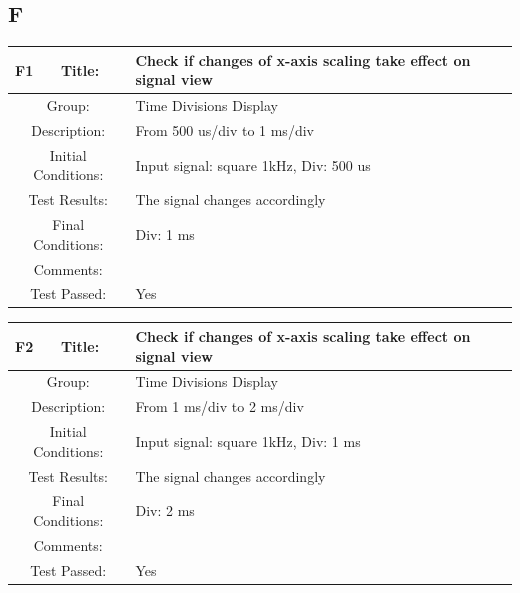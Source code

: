 \documentclass[12pt]{article}
\begin{document}
\subsection{F}
		\begin{table}[H]
	\begin{center}
		\begin{tabular}{| m{2cm}|m{2cm}|m{12cm}|}
			\hline 
			\bf F1&\bf Title:&\bf Check if changes of x-axis scaling take effect on signal view\\ 
			\hline 
			\multicolumn{2}{|c|}{Group:}&Time Divisions Display\\ 
			\hline 
			\multicolumn{2}{|c|}{Description:}&From 500 us/div to 1 ms/div\\ 
			\hline 
			\multicolumn{2}{|c|}{Initial Conditions:}&Input signal: square 1kHz, Div: 500 us\\ 
			\hline 
			\multicolumn{2}{|c|}{Test Results:}&The signal changes accordingly\\ 
			\hline 
			\multicolumn{2}{|c|}{Final Conditions:}&Div: 1 ms\\ 
			\hline 
			\multicolumn{2}{|c|}{Comments:}&\\ 
			\hline 
			\multicolumn{2}{|c|}{Test Passed:}&Yes \\ 
			\hline 
		\end{tabular} 
	\end{center}
\end{table}	
		\begin{table}[H]
	\begin{center}
		\begin{tabular}{| m{2cm}|m{2cm}|m{12cm}|}
			\hline 
			\bf F2&\bf Title:&\bf Check if changes of x-axis scaling take effect on signal view\\ 
			\hline 
			\multicolumn{2}{|c|}{Group:}&Time Divisions Display\\ 
			\hline 
			\multicolumn{2}{|c|}{Description:}&From 1 ms/div to 2 ms/div\\ 
			\hline 
			\multicolumn{2}{|c|}{Initial Conditions:}&Input signal: square 1kHz, Div: 1 ms\\ 
			\hline 
			\multicolumn{2}{|c|}{Test Results:}&The signal changes accordingly\\ 
			\hline 
			\multicolumn{2}{|c|}{Final Conditions:}&Div: 2 ms \\ 
			\hline 
			\multicolumn{2}{|c|}{Comments:}&\\ 
			\hline 
			\multicolumn{2}{|c|}{Test Passed:}&Yes \\ 
			\hline 
		\end{tabular} 
	\end{center}
\end{table}	
\end{document}
